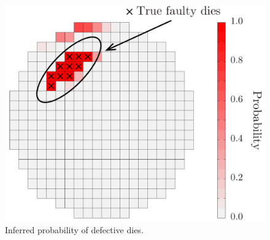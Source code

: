 \begin{figure}[t!]
  \centering
  \includegraphics[width=0.6\linewidth]{include/figures/wafer-defect.pdf}
  \caption{Inferred probability of defective dies.}
  \vspace{-1.5em}
\end{figure}
